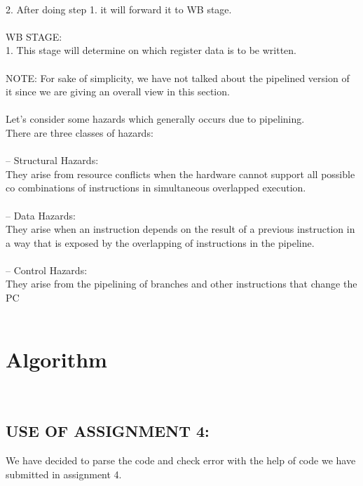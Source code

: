\documentclass{scrreprt}
\begin{document}
\\2. After doing step 1. it will forward it to WB stage.
\\
\\
WB STAGE:
\\1. This stage will determine on which register data is to be written.
\\
\\
NOTE: For sake of simplicity, we have not talked about the pipelined version of it since we are giving an overall view in this
section.
\\
\\
Let's consider some hazards which generally occurs due to pipelining.
\\There are three classes of hazards:\\
\\

\indent – Structural Hazards:
     \\They arise from resource conflicts when the 
     hardware cannot support all possible co
     combinations of instructions in 
     simultaneous overlapped execution.\\
     \\
\indent – Data Hazards:
     \\They arise when an instruction depends on the result 
     of a previous instruction in a way 
     that is exposed by the overlapping 
     of instructions in the pipeline.\\
     \\
\indent – Control Hazards:
\\
     They arise from the 
     pipelining of branches and 
     other instructions that change the PC\\
 \\
  $ $

\chapter{Algorithm}
$ $
\\
\\
$ $

\section{USE OF ASSIGNMENT 4:}
$ $\\
We have decided to parse the code and check error with the help of code we have submitted in assignment 4. \\
\\
\end{document}
